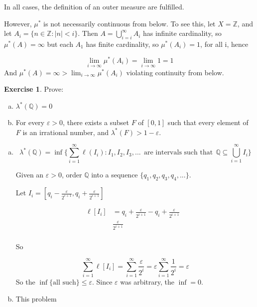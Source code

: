 \documentclass[11pt,oneside]{article}
\numberwithin{equation}{section}
\theoremstyle{definition}
\newtheorem{exercise}{Exercise}
\def\QQ{\mathbb{Q}}
\def\ZZ{\mathbb{Z}}
\begin{document}
\begin{solution}
\begin{enumerate}[(a)]
      In all cases, the definition of an outer measure are fulfilled.
  \end{enumerate}

  However, $\mu ^*$ is not necessarily continuous from below.  To see
  this, let $X = \ZZ$, and let $A_i = \{ n \in \ZZ : |n| < i \}$.
  Then $A = \bigcup \limits _ { i=i } ^ \infty A_i$ has infinite
  cardinality, so $\mu ^* ( A) = \infty$ but each $A_1$ has finite
  cardinality, so $\mu ^*(A_i) = 1$, for all i, hence

  $$ \lim _ { i \to \infty } \mu ^* (A_i) = \lim _ { i \to \infty} 1 = 1
  $$
  And $ \mu^* ( A) = \infty > \lim _ { i \to \infty } \mu ^* (A_i)$ violating
  continuity from below.  
  
\end{solution}

\begin{exercise}
  Prove:
  \begin{enumerate}[(a)]
  \item
    $\lambda ^* ( \QQ ) = 0 $
  \item
    For every $ \varepsilon > 0$, there exists a subset $F$ of $[0,1]$ such that every element of $F$ is an irrational number,
    and $ \lambda ^* ( F) > 1 - \varepsilon $.
    
  \end{enumerate}
\end{exercise}
\begin{solution}
  \begin{enumerate}[(a)]
  \item
    $$
    \lambda ^* ( \QQ) = \inf \{ \sum _{i=1} ^\infty \ell ( I _ i ) : I_1, I_2, I_3, ... \ \ \text{are intervals such that} \ \ \QQ \subseteq \bigcup \limits _ {i=1} ^ \infty I_i \} 
    $$
    
    Given an $\varepsilon > 0$, order $\QQ $ into a sequence $ \{ q_1, q_2, q_3, q_4, ... \}$. 
    
    Let $I_i = [q_i - \frac{\varepsilon}{2^{i+1}},  q_i + \frac{\varepsilon}{2^{i+1}} ] $ 
    
    \begin{align*}
      \ell [ I_i ] & = q_i + \frac{\varepsilon}{2^{i+1}} - q_i +  \frac{\varepsilon}{2^{i+1}} & \\  
      &  \frac{\varepsilon}{2^{i+1}} & \\ 
    \end{align*}
    
    So

    $$
    \sum \limits _ { i=1} ^ \infty \ell [I_i] =  \sum \limits _ { i=1} ^ \infty \frac{\varepsilon}{2^i} = \varepsilon \sum \limits _ {i=1} ^ \infty \frac{1}{2^i}= \varepsilon 
    $$
    So the $ \inf \{ \text{all such} \} \leq \varepsilon$.  Since $\varepsilon$ was arbitrary, the $ \inf = 0$.
    \item
      This problem
    
    
  \end{enumerate}
\end{solution}
\end{document}

